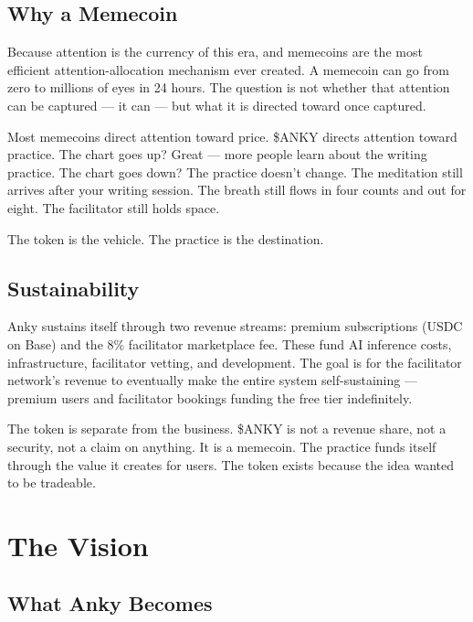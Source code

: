 \documentclass[12pt, a4paper]{article}
\begin{document}
\subsection{Why a Memecoin}

Because attention is the currency of this era, and memecoins are the most efficient attention-allocation mechanism ever created. A memecoin can go from zero to millions of eyes in 24 hours. The question is not whether that attention can be captured --- it can --- but what it is directed toward once captured.

Most memecoins direct attention toward price. \$ANKY directs attention toward practice. The chart goes up? Great --- more people learn about the writing practice. The chart goes down? The practice doesn't change. The meditation still arrives after your writing session. The breath still flows in four counts and out for eight. The facilitator still holds space.

The token is the vehicle. The practice is the destination.

\subsection{Sustainability}

Anky sustains itself through two revenue streams: premium subscriptions (USDC on Base) and the 8\% facilitator marketplace fee. These fund AI inference costs, infrastructure, facilitator vetting, and development. The goal is for the facilitator network's revenue to eventually make the entire system self-sustaining --- premium users and facilitator bookings funding the free tier indefinitely.

The token is separate from the business. \$ANKY is not a revenue share, not a security, not a claim on anything. It is a memecoin. The practice funds itself through the value it creates for users. The token exists because the idea wanted to be tradeable.

\section{The Vision}

\subsection{What Anky Becomes}
\end{document}
